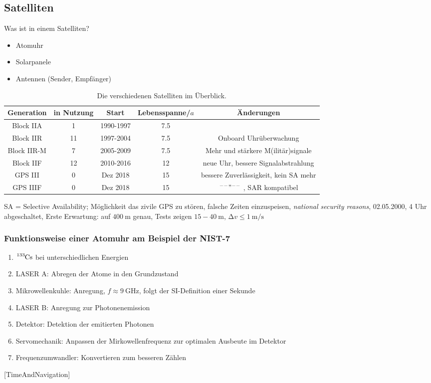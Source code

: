 \subsection{Satelliten}
Was ist in einem Satelliten?
\begin{itemize}
    \item Atomuhr
    \item Solarpanele
    \item Antennen (Sender, Empfänger)
\end{itemize}

\begin{table}[h]
    \caption{Die verschiedenen Satelliten im Überblick.}
    \label{tab:satelliten}
    \begin{tabular}{c S[table-format=2.0] c S[table-format=2.1] c}
        \toprule
        {Generation} & {in Nutzung} & {Start} & {Lebensspanne\;/\;$a$} & {Änderungen} \\
        \midrule
        Block IIA   &  1 & 1990-1997 & 7.5 & \\
        Block IIR   & 11 & 1997-2004 & 7.5 & Onboard Uhrüberwachung \\
        Block IIR-M &  7 & 2005-2009 & 7.5 & Mehr und stärkere M(ilitär)signale \\
        Block IIF   & 12 & 2010-2016 & 12  & neue Uhr, bessere Signalabstrahlung \\
        GPS III     &  0 & Dez 2018  & 15  & bessere Zuverlässigkeit, kein SA mehr \\
        GPS IIIF    &  0 & Dez 2018  & 15  & $^{\---}"^{\---}$ , SAR kompatibel \\
        \bottomrule
    \end{tabular}
\end{table}
SA = Selective Availability; Möglichkeit das zivile GPS zu stören, falsche Zeiten einzuspeisen, \textit{national security reasons}, 02.05.2000, 4 Uhr abgeschaltet,
Erste Erwartung: auf $\SI{400}{\meter}$ genau, Tests zeigen $15 - \SI{40}{\meter}$, $\increment v\leq \SI{1}{\meter\per\second}$

\subsubsection{Funktionsweise einer Atomuhr am Beispiel der NIST-7}
\begin{enumerate}
    \item $\ce{^133Cs}$ bei unterschiedlichen Energien
    \item LASER A: Abregen der Atome in den Grundzustand
    \item Mikrowellenkuhle: Anregung, $f\approx\SI{9}{\giga\hertz}$, folgt der SI-Definition einer Sekunde
    \item LASER B: Anregung zur Photonenemission
    \item Detektor: Detektion der emitierten Photonen
    \item Servomechanik: Anpassen der Mirkowellenfrequenz zur optimalen Ausbeute im Detektor
    \item Frequenzumwandler: Konvertieren zum besseren Zählen
\end{enumerate}
{\small [TimeAndNavigation]}
